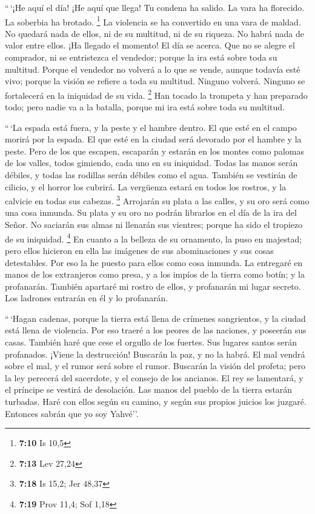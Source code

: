  ``\,`¡He aquí el día! ¡He aquí que llega! Tu condena ha
salido. La vara ha florecido. La soberbia ha brotado. \footnote{\textbf{7:10}
  Is 10,5}  La violencia se ha convertido en una vara de
maldad. No quedará nada de ellos, ni de su multitud, ni de su riqueza.
No habrá nada de valor entre ellos.  ¡Ha llegado el
momento! El día se acerca. Que no se alegre el comprador, ni se
entristezca el vendedor; porque la ira está sobre toda su multitud.
 Porque el vendedor no volverá a lo que se vende, aunque
todavía esté vivo; porque la visión se refiere a toda su multitud.
Ninguno volverá. Ninguno se fortalecerá en la iniquidad de su vida.
\footnote{\textbf{7:13} Lev 27,24}  Han tocado la
trompeta y han preparado todo; pero nadie va a la batalla, porque mi ira
está sobre toda su multitud.

 ``\,`La espada está fuera, y la peste y el hambre
dentro. El que esté en el campo morirá por la espada. El que esté en la
ciudad será devorado por el hambre y la peste.  Pero de
los que escapen, escaparán y estarán en los montes como palomas de los
valles, todos gimiendo, cada uno en su iniquidad.  Todas
las manos serán débiles, y todas las rodillas serán débiles como el
agua.  También se vestirán de cilicio, y el horror los
cubrirá. La vergüenza estará en todos los rostros, y la calvicie en
todas sus cabezas. \footnote{\textbf{7:18} Is 15,2; Jer 48,37}
 Arrojarán su plata a las calles, y su oro será como una
cosa inmunda. Su plata y su oro no podrán librarlos en el día de la ira
del Señor. No saciarán sus almas ni llenarán sus vientres; porque ha
sido el tropiezo de su iniquidad. \footnote{\textbf{7:19} Prov 11,4; Sof
  1,18}  En cuanto a la belleza de su ornamento, la puso
en majestad; pero ellos hicieron en ella las imágenes de sus
abominaciones y sus cosas detestables. Por eso la he puesto para ellos
como cosa inmunda.  La entregaré en manos de los
extranjeros como presa, y a los impíos de la tierra como botín; y la
profanarán.  También apartaré mi rostro de ellos, y
profanarán mi lugar secreto. Los ladrones entrarán en él y lo
profanarán.

 ``\,`Hagan cadenas, porque la tierra está llena de
crímenes sangrientos, y la ciudad está llena de violencia.
 Por eso traeré a los peores de las naciones, y poseerán
sus casas. También haré que cese el orgullo de los fuertes. Sus lugares
santos serán profanados.  ¡Viene la destrucción! Buscarán
la paz, y no la habrá.  El mal vendrá sobre el mal, y el
rumor será sobre el rumor. Buscarán la visión del profeta; pero la ley
perecerá del sacerdote, y el consejo de los ancianos.  El
rey se lamentará, y el príncipe se vestirá de desolación. Las manos del
pueblo de la tierra estarán turbadas. Haré con ellos según su camino, y
según sus propios juicios los juzgaré. Entonces sabrán que yo soy
Yahvé''.


